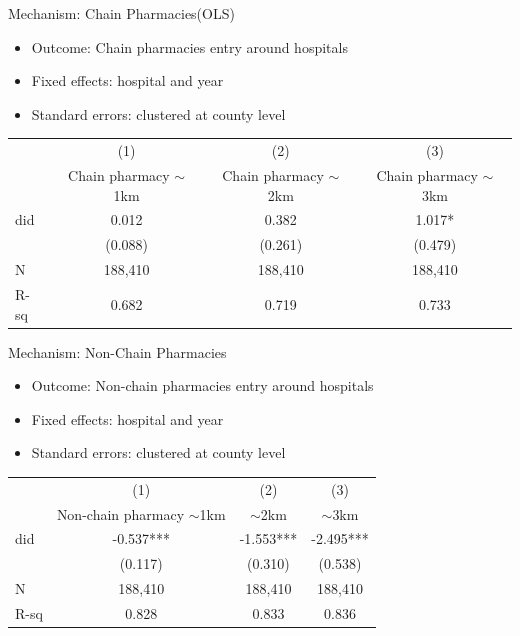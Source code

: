 \documentclass{beamer}
\begin{document}
\begin{frame}{Mechanism: Chain Pharmacies(OLS)}

\begin{itemize}
    \item Outcome: Chain pharmacies entry around hospitals 
    \item Fixed effects: hospital and year
    \item Standard errors: clustered at county level
\end{itemize}

\vspace{0.5em}
\centering
\footnotesize
\begin{tabular}{lccc}
\hline
\hline
 & (1) & (2) & (3) \\
 & Chain pharmacy $\sim$1km & Chain pharmacy $\sim$2km & Chain pharmacy $\sim$3km \\
\hline
did & 0.012 & 0.382 & 1.017* \\
    & (0.088) & (0.261) & (0.479) \\
\hline
N   & 188,410 & 188,410 & 188,410 \\
R-sq & 0.682  & 0.719  & 0.733  \\
\hline
\hline
\end{tabular}

\end{frame}


\begin{frame}{Mechanism: Non-Chain Pharmacies}

\begin{itemize}
    \item Outcome: Non-chain pharmacies entry around hospitals 
    \item Fixed effects: hospital and year
    \item Standard errors: clustered at county level
\end{itemize}

\vspace{0.5em}
\centering
\footnotesize
\begin{tabular}{lccc}
\hline
\hline
 & (1) & (2) & (3) \\
 & Non-chain pharmacy $\sim$1km & $\sim$2km & $\sim$3km \\
\hline
did & -0.537*** & -1.553*** & -2.495*** \\
    & (0.117)   & (0.310)   & (0.538)   \\
\hline
N   & 188,410   & 188,410   & 188,410   \\
R-sq & 0.828    & 0.833     & 0.836     \\
\hline
\hline
\end{tabular}


\end{frame}
\end{document}
